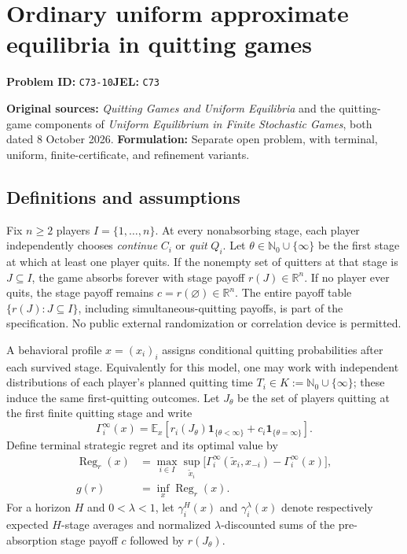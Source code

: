 \documentclass[11pt,a4paper]{article}
\newcommand{\R}{\mathbb R}
\newcommand{\E}{\mathbb E}
\begin{document}
\section*{Ordinary uniform approximate equilibria in quitting games}
\textbf{Problem ID:} \texttt{C73-10}\quad \textbf{JEL:} \texttt{C73}\par
\label{problem:OP-0591}
\label{supp:quitting-games}

\noindent\textbf{Original sources:} \emph{Quitting Games and Uniform
	Equilibria} and the quitting-game components of \emph{Uniform
	Equilibrium in Finite Stochastic Games}, both dated 8 October 2026.
\textbf{Formulation:} Separate open problem, with terminal,
uniform, finite-certificate, and refinement variants.

\subsection*{Definitions and assumptions}

Fix $n\ge2$ players $I=\{1,\ldots,n\}$. At every nonabsorbing
stage, each player independently chooses \emph{continue} $C_i$ or
\emph{quit} $Q_i$. Let $\theta\in\mathbb N_0\cup\{\infty\}$ be the
first stage at which at least one player quits. If the nonempty set of
quitters at that stage is $J\subseteq I$, the game absorbs forever with
stage payoff $r(J)\in\R^n$. If no player ever quits, the stage payoff
remains $c=r(\varnothing)\in\R^n$. The entire payoff table
$\{r(J):J\subseteq I\}$, including simultaneous-quitting payoffs, is
part of the specification. No public external randomization or
correlation device is permitted.

A behavioral profile $x=(x_i)_i$ assigns conditional quitting
probabilities after each survived stage. Equivalently for this model,
one may work with independent distributions of each player's planned
quitting time $T_i\in K:=\mathbb N_0\cup\{\infty\}$; these induce the
same first-quitting outcomes. Let $J_\theta$ be the set of players
quitting at the first finite quitting stage and write
\[
\Gamma_i^\infty(x)=\E_x\!\left[
r_i(J_\theta)\mathbf1_{\{\theta<\infty\}}
+c_i\mathbf1_{\{\theta=\infty\}}\right].
\]
Define terminal strategic regret and its optimal value by
\[
\begin{aligned}
	\operatorname{Reg}_r(x)
	&=\max_{i\in I}\sup_{\widetilde x_i}
	\bigl[\Gamma_i^\infty(\widetilde x_i,x_{-i})
	-\Gamma_i^\infty(x)\bigr],\\
	g(r)&=\inf_{x}\operatorname{Reg}_r(x).
\end{aligned}
\]
For a horizon $H$ and $0<\lambda<1$, let
$\gamma_i^H(x)$ and $\gamma_i^\lambda(x)$ denote respectively
expected $H$-stage averages and normalized $\lambda$-discounted sums
of the pre-absorption stage payoff $c$ followed by $r(J_\theta)$.
\end{document}

